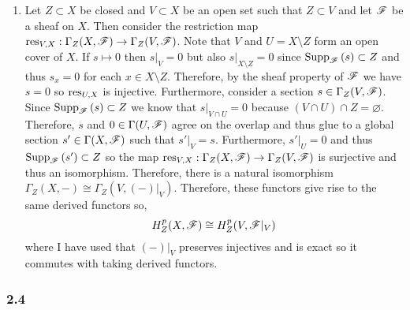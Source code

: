 \documentclass[12pt]{article}
\begin{document}
\begin{enumerate}
\item Let $Z \subset X$ be closed and $V \subset X$ be an open set such that $Z \subset V$ and let $\mathscr{F}$ be a sheaf on $X$. Then consider the restriction map $\mathrm{res}_{V, X} : \Gamma_Z(X, \mathscr{F}) \to \Gamma_Z(V, \mathscr{F})$. Note that $V$ and $U = X \setminus Z$ form an open cover of $X$. If $s \mapsto 0$ then $s|_V = 0$ but also $s|_{X \setminus Z} = 0$ since $\mathrm{Supp}_{\mathscr{F}}\left(s \right) \subset Z$ and thus $s_x = 0$ for each $x \in X \setminus Z$. Therefore, by the sheaf property of $\mathscr{F}$ we have $s = 0$ so $\mathrm{res}_{U,X}$ is injective. Furthermore, consider a section $s \in \Gamma_Z(V, \mathscr{F})$. Since $\mathrm{Supp}_{\mathscr{F}}\left(s \right) \subset Z$ we know that $s |_{V \cap U} = 0$ because $(V \cap U) \cap Z = \varnothing$. Therefore, $s$ and $0 \in \Gamma(U, \mathscr{F})$ agree on the overlap and thus glue to a global section $s' \in \Gamma(X, \mathscr{F})$ such that $s'|_V = s$. Furthermore, $s' |_U = 0$ and thus $\mathrm{Supp}_{\mathscr{F}}\left(s' \right) \subset Z$ so the map $\mathrm{res}_{V, X} : \Gamma_Z(X, \mathscr{F}) \to \Gamma_Z(V, \mathscr{F})$ is surjective and thus an isomorphism. Therefore, there is a natural isomorphism $\Gamma_Z(X, -) \cong \Gamma_Z(V, (-)|_V)$. Therefore, these functors give rise to the same derived functors so,
\[ H^p_Z(X, \mathscr{F}) \cong H^p_Z(V, \mathscr{F}|_V) \] 
where I have used that $(-)|_V$ preserves injectives and is exact so it commutes with taking derived functors.

\end{enumerate}

\subsubsection{2.4}
\end{document}
